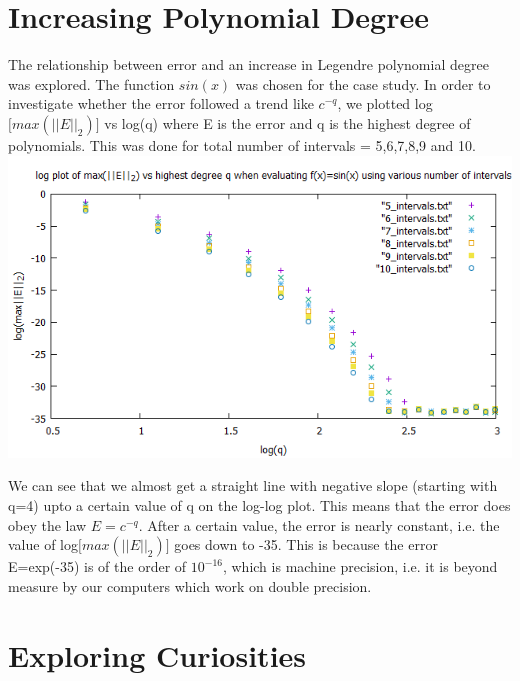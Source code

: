 \documentclass{article}
\begin{document}
\section{Increasing Polynomial Degree}
The relationship between error and an increase in Legendre polynomial degree was explored. The function $sin(x)$ was chosen for the case study. In order to investigate whether the error followed a trend like $c^{-q}$, we plotted log$\big[max(||E||_{2})\big]$ vs log(q) where E is the error and q is the highest degree of polynomials. This was done for total number of intervals = 5,6,7,8,9 and 10.
\includegraphics[scale=0.5]{hw3.png}

We can see that we almost get a straight line with negative slope (starting with q=4) upto a certain value of q on the log-log plot. This means that the error does obey the law $E=c^{-q}$. After a certain value, the error is nearly constant, i.e. the value of log$\big[max(||E||_{2})\big]$ goes down to -35. This is because the error E=exp(-35) is of the order of $10^{-16}$, which is machine precision, i.e. it is beyond measure by our computers which work on double precision.

\section{Exploring Curiosities}
\end{document}
